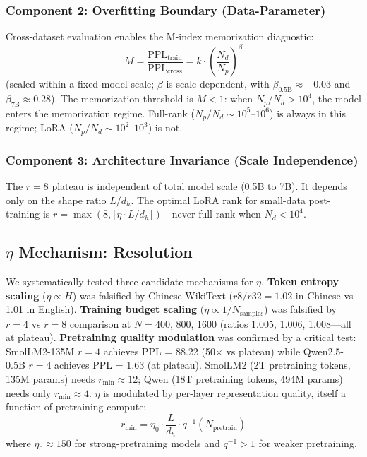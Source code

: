 \documentclass[11pt]{article}
\begin{document}
\subsubsection{Component 2: Overfitting Boundary (Data-Parameter)}

Cross-dataset evaluation enables the M-index memorization diagnostic:
\begin{equation}
M = \frac{\text{PPL}_{\text{train}}}{\text{PPL}_{\text{cross}}} = k \cdot \left(\frac{N_d}{N_p}\right)^\beta
\end{equation}
(scaled within a fixed model scale; $\beta$ is scale-dependent, with $\beta_{0.5\text{B}} \approx -0.03$ and $\beta_{7\text{B}} \approx 0.28$). The memorization threshold is $M < 1$: when $N_p/N_d > 10^4$, the model enters the memorization regime. Full-rank ($N_p/N_d \sim 10^5$--$10^6$) is always in this regime; LoRA ($N_p/N_d \sim 10^2$--$10^3$) is not.

\subsubsection{Component 3: Architecture Invariance (Scale Independence)}

The $r=8$ plateau is independent of total model scale (0.5B to 7B). It depends only on the shape ratio $L/d_h$. The optimal LoRA rank for small-data post-training is $r = \max(8, \lceil \eta \cdot L/d_h \rceil)$---never full-rank when $N_d < 10^4$.

\subsection{$\eta$ Mechanism: Resolution}

We systematically tested three candidate mechanisms for $\eta$. \textbf{Token entropy scaling} ($\eta \propto H$) was falsified by Chinese WikiText ($r8/r32 = 1.02$ in Chinese vs 1.01 in English). \textbf{Training budget scaling} ($\eta \propto 1/N_{\text{samples}}$) was falsified by $r=4$ vs $r=8$ comparison at $N = 400$, 800, 1600 (ratios 1.005, 1.006, 1.008---all at plateau). \textbf{Pretraining quality modulation} was confirmed by a critical test: SmolLM2-135M $r=4$ achieves PPL = 88.22 (50$\times$ vs plateau) while Qwen2.5-0.5B $r=4$ achieves PPL = 1.63 (at plateau). SmolLM2 (2T pretraining tokens, 135M params) needs $r_{\min} \approx 12$; Qwen (18T pretraining tokens, 494M params) needs only $r_{\min} \approx 4$. $\eta$ is modulated by per-layer representation quality, itself a function of pretraining compute:
\begin{equation}
r_{\min} = \eta_0 \cdot \frac{L}{d_h} \cdot q^{-1}(N_{\text{pretrain}})
\end{equation}
where $\eta_0 \approx 150$ for strong-pretraining models and $q^{-1} > 1$ for weaker pretraining.
\end{document}
